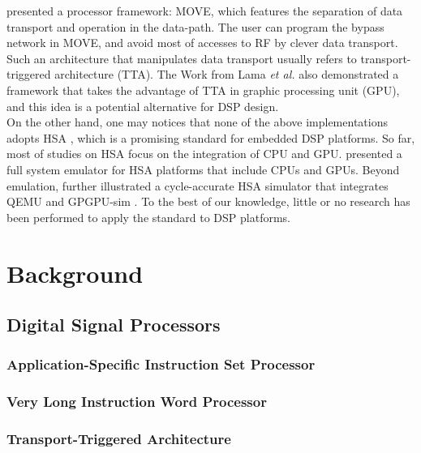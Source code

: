 \documentclass[12pt]{article}
\begin{document}
\begin{CJK}{UTF8}{bkai}
    \cite{move} presented a processor framework: MOVE, which features the separation of data transport and operation in the data-path. 
    The user can program the bypass network in MOVE, and avoid most of accesses to RF by clever data transport.
    Such an architecture that manipulates data transport usually refers to transport-triggered architecture (TTA).
    The Work from Lama \textit{et al.} \cite{ttagpu} also demonstrated a framework that takes the advantage of TTA in graphic processing unit (GPU), and this idea is a potential alternative for DSP design.
    \\
    On the other hand, one may notices that none of the above implementations adopts HSA \cite{systemspec}, which is a promising standard for embedded DSP platforms.
    So far, most of studies on HSA focus on the integration of CPU and GPU. \cite{hsaemu} presented a full system emulator for HSA platforms that include CPUs and GPUs.
    Beyond emulation, \cite{hsacyc} further illustrated a cycle-accurate HSA simulator that integrates QEMU and GPGPU-sim \cite{gpgpusim}.
    To the best of our knowledge, little or no research has been performed to apply the standard to DSP platforms.

\newpage

\section{Background}

    \subsection{Digital Signal Processors}
        \subsubsection{Application-Specific Instruction Set Processor}
        \subsubsection{Very Long Instruction Word Processor}
        \subsubsection{Transport-Triggered Architecture}


\end{CJK}
\end{document}

